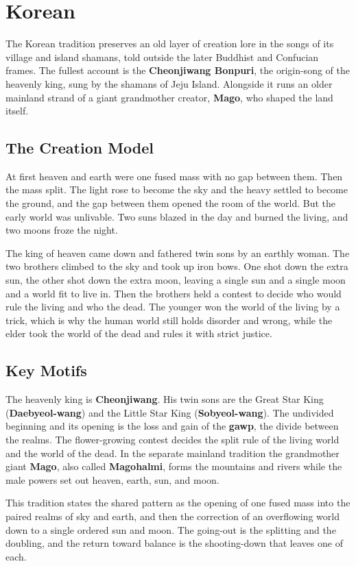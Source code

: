\section{Korean}

The Korean tradition preserves an old layer of creation lore in the songs of its village and island shamans, told outside the later Buddhist and Confucian frames. The fullest account is the \textbf{Cheonjiwang Bonpuri}, the origin-song of the heavenly king, sung by the shamans of Jeju Island. Alongside it runs an older mainland strand of a giant grandmother creator, \textbf{Mago}, who shaped the land itself.

\subsection{The Creation Model}

At first heaven and earth were one fused mass with no gap between them. Then the mass split. The light rose to become the sky and the heavy settled to become the ground, and the gap between them opened the room of the world. But the early world was unlivable. Two suns blazed in the day and burned the living, and two moons froze the night.

The king of heaven came down and fathered twin sons by an earthly woman. The two brothers climbed to the sky and took up iron bows. One shot down the extra sun, the other shot down the extra moon, leaving a single sun and a single moon and a world fit to live in. Then the brothers held a contest to decide who would rule the living and who the dead. The younger won the world of the living by a trick, which is why the human world still holds disorder and wrong, while the elder took the world of the dead and rules it with strict justice.

\subsection{Key Motifs}

The heavenly king is \textbf{Cheonjiwang}. His twin sons are the Great Star King (\textbf{Daebyeol-wang}) and the Little Star King (\textbf{Sobyeol-wang}). The undivided beginning and its opening is the loss and gain of the \textbf{gawp}, the divide between the realms. The flower-growing contest decides the split rule of the living world and the world of the dead. In the separate mainland tradition the grandmother giant \textbf{Mago}, also called \textbf{Magohalmi}, forms the mountains and rivers while the male powers set out heaven, earth, sun, and moon.

This tradition states the shared pattern as the opening of one fused mass into the paired realms of sky and earth, and then the correction of an overflowing world down to a single ordered sun and moon. The going-out is the splitting and the doubling, and the return toward balance is the shooting-down that leaves one of each.
